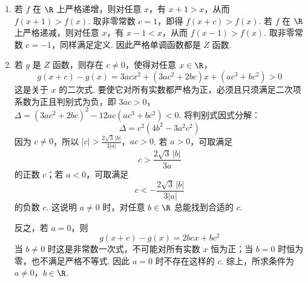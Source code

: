 \begin{solution}
\begin{enumerate}
\item 若 \(f\) 在 \(\R\) 上严格递增，则对任意 \(x\)，有 \(x+1>x\)，从而 \(f(x+1)>f(x)\). 取非零常数 \(c=1\)，即得 \(f(x+c)>f(x)\). 若 \(f\) 在 \(\R\) 上严格递减，则对任意 \(x\)，有 \(x-1<x\)，从而 \(f(x-1)>f(x)\). 取非零常数 \(c=-1\)，同样满足定义. 因此严格单调函数都是 \(Z\) 函数.

\item 若 \(g\) 是 \(Z\) 函数，则存在 \(c\ne0\)，使得对任意 \(x\in\R\)，
\[
g(x+c)-g(x)
=3acx^2+(3ac^2+2bc)x+(ac^3+bc^2)>0
\]
这是关于 \(x\) 的二次式. 要使它对所有实数都严格为正，必须且只须满足二次项系数为正且判别式为负，即
\(3ac>0\)，\(\Delta=(3ac^2+2bc)^2-12ac(ac^3+bc^2)<0\).
将判别式因式分解：
\[
\Delta=c^2\left(4b^2-3a^2c^2\right)
\]
因为 \(c\ne0\)，所以
\(|c|>\frac{2\sqrt3\,|b|}{3|a|}\)，\(ac>0\).
若 \(a>0\)，可取满足
\[
c>\frac{2\sqrt3\,|b|}{3a}
\]
的正数 \(c\)；若 \(a<0\)，可取满足
\[
c<-\frac{2\sqrt3\,|b|}{3|a|}
\]
的负数 \(c\). 这说明 \(a\ne0\) 时，对任意 \(b\in\R\) 总能找到合适的 \(c\).

反之，若 \(a=0\)，则
\[
g(x+c)-g(x)=2bcx+bc^2
\]
当 \(b\ne0\) 时这是非常数一次式，不可能对所有实数 \(x\) 恒为正；当 \(b=0\) 时恒为零，也不满足严格不等式. 因此 \(a=0\) 时不存在这样的 \(c\). 综上，所求条件为
\(a\ne0\)，\(b\in\R\).
\end{enumerate}
\end{solution}
